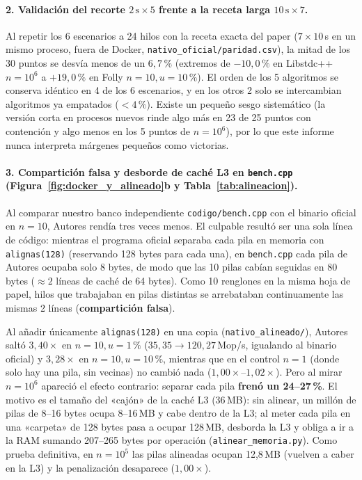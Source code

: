 \documentclass[11pt,a4paper]{article}
\begin{document}
\paragraph{2. Validación del recorte $2\,\text{s} \times 5$ frente a la receta larga $10\,\text{s} \times 7$.}
Al repetir los 6 escenarios a 24 hilos con la receta exacta del paper ($7 \times 10$\,s en un mismo proceso, fuera de Docker, \texttt{nativo\_oficial/paridad.csv}), la mitad de los 30 puntos se desvía menos de un $6,7\,\%$ (extremos de $-10,0\,\%$ en Libstdc++ $n=10^6$ a $+19,0\,\%$ en Folly $n=10, u=10\,\%$). El orden de los 5 algoritmos se conserva idéntico en 4 de los 6 escenarios, y en los otros 2 solo se intercambian algoritmos ya empatados ($<4\,\%$). Existe un pequeño sesgo sistemático (la versión corta en procesos nuevos rinde algo más en 23 de 25 puntos con contención y algo menos en los 5 puntos de $n=10^6$), por lo que este informe nunca interpreta márgenes pequeños como victorias.

\paragraph{3. Compartición falsa y desborde de caché L3 en \texttt{bench.cpp} (Figura~\ref{fig:docker_y_alineado}b y Tabla~\ref{tab:alineacion}).}
Al comparar nuestro banco independiente \texttt{codigo/bench.cpp} con el binario oficial en $n=10$, Autores rendía tres veces menos. El culpable resultó ser una sola línea de código: mientras el programa oficial separaba cada pila en memoria con \texttt{alignas(128)} (reservando 128 bytes para cada una), en \texttt{bench.cpp} cada pila de Autores ocupaba solo 8 bytes, de modo que las 10 pilas cabían seguidas en 80 bytes ($\approx 2$ líneas de caché de 64 bytes). Como 10 renglones en la misma hoja de papel, hilos que trabajaban en pilas distintas se arrebataban continuamente las mismas 2 líneas (\textbf{compartición falsa}).

Al añadir únicamente \texttt{alignas(128)} en una copia (\texttt{nativo\_alineado/}), Autores saltó \textbf{$3,40\times$} en $n=10, u=1\,\%$ ($35,35 \to 120,27$\,Mop/s, igualando al binario oficial) y \textbf{$3,28\times$} en $n=10, u=10\,\%$, mientras que en el control $n=1$ (donde solo hay una pila, sin vecinas) no cambió nada ($1,00\times$--$1,02\times$). Pero al mirar $n=10^6$ apareció el efecto contrario: separar cada pila \textbf{frenó un 24--27\,\%}. El motivo es el tamaño del «cajón» de la caché L3 (36\,MB): sin alinear, un millón de pilas de 8--16 bytes ocupa 8--16\,MB y cabe dentro de la L3; al meter cada pila en una «carpeta» de 128 bytes pasa a ocupar 128\,MB, desborda la L3 y obliga a ir a la RAM sumando 207--265 bytes por operación (\texttt{alinear\_memoria.py}). Como prueba definitiva, en $n=10^5$ las pilas alineadas ocupan 12,8\,MB (vuelven a caber en la L3) y la penalización desaparece ($1,00\times$).
\end{document}
